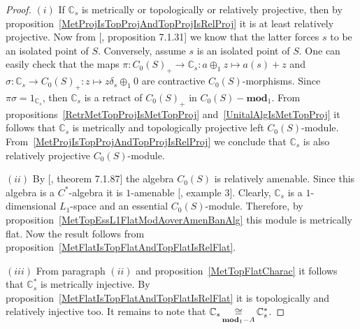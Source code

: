 \begin{proof} $(i)$ If $\mathbb{C}_s$ is metrically or topologically or
relatively projective, then by
proposition~\ref{MetProjIsTopProjAndTopProjIsRelProj} it is at least relatively
projective. Now from [\cite{HelBanLocConvAlg}, proposition 7.1.31] we know that
the latter forces $s$ to be an isolated point of $S$. Conversely, assume $s$ is
an isolated point of $S$. One can easily check that the maps
$\pi:{C_0(S)}_+\to\mathbb{C}_s:a\oplus_1 z\mapsto a(s)+z$ and
$\sigma:\mathbb{C}_s\to {C_0(S)}_+:z\mapsto z\delta_s\oplus_1 0$ are contractive
$C_0(S)$-morphisms. Since $\pi\sigma=1_{\mathbb{C}_s}$, then $\mathbb{C}_s$ is a
retract of ${C_0(S)}_+$ in $C_0(S)-\mathbf{mod}_1$. From
propositions~\ref{RetrMetTopProjIsMetTopProj} and~\ref{UnitalAlgIsMetTopProj} it
follows that $\mathbb{C}_s$ is metrically and topologically projective left
$C_0(S)$-module. From~\ref{MetProjIsTopProjAndTopProjIsRelProj} we conclude that
$\mathbb{C}_s$ is also relatively projective $C_0(S)$-module.

$(ii)$ By [\cite{HelBanLocConvAlg}, theorem 7.1.87] the algebra $C_0(S)$ is
relatively amenable. Since this algebra is a $C^*$-algebra it is $1$-amenable
[\cite{RundeAmenConstFour}, example 3]. Clearly, $\mathbb{C}_s$ is a
$1$-dimensional $L_1$-space and an essential $C_0(S)$-module. Therefore, by
proposition~\ref{MetTopEssL1FlatModAoverAmenBanAlg} this module is metrically
flat. Now the result follows from
proposition~\ref{MetFlatIsTopFlatAndTopFlatIsRelFlat}.

$(iii)$ From paragraph $(ii)$ and proposition~\ref{MetTopFlatCharac} it follows
that $\mathbb{C}_s^*$ is metrically injective. By
proposition~\ref{MetFlatIsTopFlatAndTopFlatIsRelFlat} it is topologically and
relatively injective too. It remains to note that
$\mathbb{C}_s\mathop{\mathbin{\cong}}\limits_{\mathbf{mod}_1-A}\mathbb{C}_s^*$. 
\end{proof}

